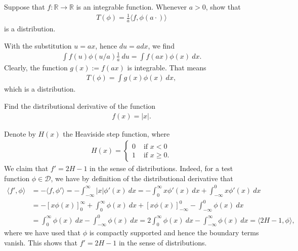 \documentclass[11pt]{article}
\begin{document}
\begin{exercise}
    Suppose that $f : \mathbb R \rightarrow \mathbb R$ is an integrable function. 
    Whenever $a > 0$, show that 
    \begin{align}
        T( \phi ) = \frac{1}{a} \langle f, \phi(a \cdot) \rangle 
    \end{align}
	is a distribution. 
\end{exercise}
\begin{solution}
    With the substitution $u = ax$, hence $du = a dx$, we find 
    \begin{align}
        \int f(u) \phi(u/a) \frac 1 a \ d u
        = 
        \int f(ax) \phi(x) \ d x 
        .
    \end{align}
	Clearly, the function $g(x) := f(ax)$ is integrable. That means 
	\begin{align}
        T( \phi ) = \int g(x) \phi(x) \ dx,
    \end{align}
	which is a distribution. 
\end{solution}



\begin{exercise}
    Find the distributional derivative of the function 
    \begin{align}
        f(x) = |x|.
    \end{align}
\end{exercise}
\begin{solution}
    Denote by $H(x)$ the Heaviside step function, where
    \begin{align}
        H(x) = \begin{cases}
                0 & \text{ if } x < 0 \\
                1 & \text{ if } x \geq 0.
               \end{cases}
    \end{align}
    We claim that $f' = 2 H - 1$ in the sense of distributions. Indeed, for a test function $\phi \in \mathcal{D}$,
     we have by definition of the distributional derivative that
    \begin{align}
        \langle f', \phi \rangle &= - \langle f, \phi' \rangle = - \int_{-\infty}^{\infty} |x| \phi'(x) \ dx = - \int_0^\infty x \phi'(x) \ dx + \int_{-\infty}^0 x\phi'(x) \ dx \\
        &= -[x \phi(x)]_0^\infty + \int_0^\infty \phi(x) \ dx + [x \phi(x)]_{-\infty}^0 - \int_{-\infty}^0 \phi(x) \ dx \\
        &= \int_0^\infty \phi(x) \ dx - \int_{-\infty}^0 \phi(x) \ dx = 2 \int_0^\infty \phi(x) \ dx - \int_{-\infty}^{\infty} \phi(x) \ dx = \langle 2H - 1, \phi \rangle,
    \end{align}
    where we have used that $\phi$ is compactly supported and hence the boundary terms vanish. This shows that $f' = 2H - 1$ in the sense of distributions.
\end{solution}
\end{document}

